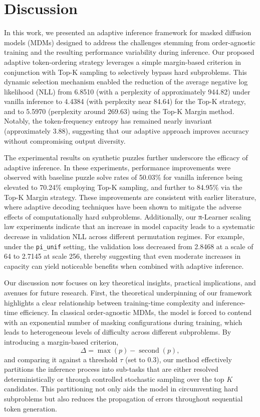 \documentclass{article}
\begin{document}
\section{Discussion}
In this work, we presented an adaptive inference framework for masked diffusion models (MDMs) designed to address the challenges stemming from order-agnostic training and the resulting performance variability during inference. Our proposed adaptive token-ordering strategy leverages a simple margin-based criterion in conjunction with Top-K sampling to selectively bypass hard subproblems. This dynamic selection mechanism enabled the reduction of the average negative log likelihood (NLL) from 6.8510 (with a perplexity of approximately 944.82) under vanilla inference to 4.4384 (with perplexity near 84.64) for the Top-K strategy, and to 5.5970 (perplexity around 269.63) using the Top-K Margin method. Notably, the token-frequency entropy has remained nearly invariant (approximately 3.88), suggesting that our adaptive approach improves accuracy without compromising output diversity.

The experimental results on synthetic puzzles further underscore the efficacy of adaptive inference. In these experiments, performance improvements were observed with baseline puzzle solve rates of 50.03\% for vanilla inference being elevated to 70.24\% employing Top-K sampling, and further to 84.95\% via the Top-K Margin strategy. These improvements are consistent with earlier literature, where adaptive decoding techniques have been shown to mitigate the adverse effects of computationally hard subproblems. Additionally, our π-Learner scaling law experiments indicate that an increase in model capacity leads to a systematic decrease in validation NLL across different permutation regimes. For example, under the \texttt{pi\_unif} setting, the validation loss decreased from 2.8468 at a scale of 64 to 2.7145 at scale 256, thereby suggesting that even moderate increases in capacity can yield noticeable benefits when combined with adaptive inference.

Our discussion now focuses on key theoretical insights, practical implications, and avenues for future research. First, the theoretical underpinning of our framework highlights a clear relationship between training-time complexity and inference-time efficiency. In classical order-agnostic MDMs, the model is forced to contend with an exponential number of masking configurations during training, which leads to heterogeneous levels of difficulty across different subproblems. By introducing a margin-based criterion,
\[
\Delta = \max(p) - \operatorname{second}(p),
\]
and comparing it against a threshold \(\tau\) (set to 0.3), our method effectively partitions the inference process into sub-tasks that are either resolved deterministically or through controlled stochastic sampling over the top \(K\) candidates. This partitioning not only aids the model in circumventing hard subproblems but also reduces the propagation of errors throughout sequential token generation.
\end{document}
